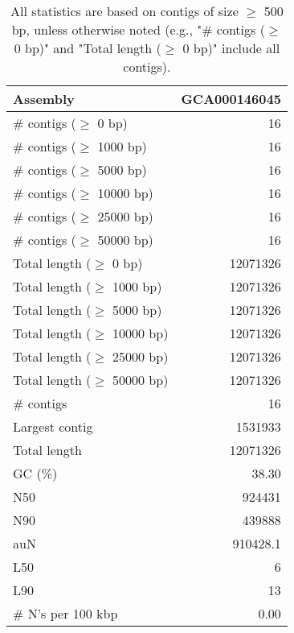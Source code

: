 \documentclass[12pt,a4paper]{article}
\begin{document}
\begin{table}[ht]
\begin{center}
\caption{All statistics are based on contigs of size $\geq$ 500 bp, unless otherwise noted (e.g., "\# contigs ($\geq$ 0 bp)" and "Total length ($\geq$ 0 bp)" include all contigs).}
\begin{tabular}{|l*{1}{|r}|}
\hline
Assembly & GCA000146045 \\ \hline
\# contigs ($\geq$ 0 bp) & 16 \\ \hline
\# contigs ($\geq$ 1000 bp) & 16 \\ \hline
\# contigs ($\geq$ 5000 bp) & 16 \\ \hline
\# contigs ($\geq$ 10000 bp) & 16 \\ \hline
\# contigs ($\geq$ 25000 bp) & 16 \\ \hline
\# contigs ($\geq$ 50000 bp) & 16 \\ \hline
Total length ($\geq$ 0 bp) & 12071326 \\ \hline
Total length ($\geq$ 1000 bp) & 12071326 \\ \hline
Total length ($\geq$ 5000 bp) & 12071326 \\ \hline
Total length ($\geq$ 10000 bp) & 12071326 \\ \hline
Total length ($\geq$ 25000 bp) & 12071326 \\ \hline
Total length ($\geq$ 50000 bp) & 12071326 \\ \hline
\# contigs & 16 \\ \hline
Largest contig & 1531933 \\ \hline
Total length & 12071326 \\ \hline
GC (\%) & 38.30 \\ \hline
N50 & 924431 \\ \hline
N90 & 439888 \\ \hline
auN & 910428.1 \\ \hline
L50 & 6 \\ \hline
L90 & 13 \\ \hline
\# N's per 100 kbp & 0.00 \\ \hline
\end{tabular}
\end{center}
\end{table}
\end{document}
